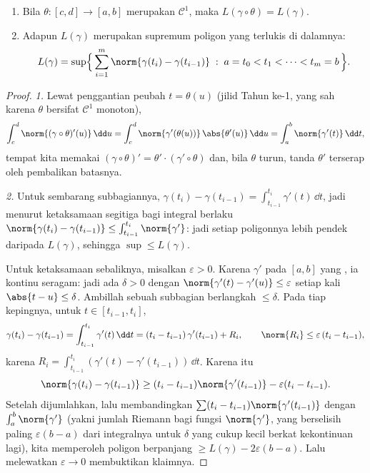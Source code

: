 \begin{theorem}\label{thm:b2:curves:lengthinv}
\leavevmode
\begin{enumerate}
\item Bila $\theta \colon [c, d] \to [a, b]$ merupakan  $\mathcal{C}^1$, maka $L(\gamma \circ \theta) = L(\gamma)$.
\item Adapun $L(\gamma)$ merupakan supremum  poligon yang
terlukis di dalamnya:
\[
L(\gamma)
= \sup\Bigl\{\, \sum_{i=1}^{m} \norm{\gamma(t_i) -
\gamma(t_{i-1})} \;:\; a = t_0 < t_1 < \dots < t_m = b \,\Bigr\}.
\]
\end{enumerate}
\end{theorem}

\begin{proof}
\emph{1.} Lewat penggantian peubah $t = \theta(u)$ (jilid Tahun
ke-1, yang sah karena $\theta$ bersifat $\mathcal{C}^1$ monoton),
\[
\int_c^d \norm{(\gamma\circ\theta)'(u)}\,\dd u
= \int_c^d \norm{\gamma'(\theta(u))}\,\abs{\theta'(u)}\,\dd u
= \int_a^b \norm{\gamma'(t)}\,\dd t ,
\]
tempat kita memakai $(\gamma\circ\theta)' = \theta'\cdot
(\gamma'\circ\theta)$ dan, bila $\theta$ turun, tanda
$\theta'$ terserap oleh pembalikan batasnya.

\emph{2.} Untuk sembarang subbagiannya, $\gamma(t_i) - \gamma(t_{i-1}) =
\int_{t_{i-1}}^{t_i}\gamma'(t)\,\dd t$, jadi menurut ketaksamaan
segitiga bagi integral berlaku $\norm{\gamma(t_i) - \gamma(t_{i-1})}
\leq \int_{t_{i-1}}^{t_i}\norm{\gamma'}$: jadi setiap poligonnya lebih pendek
daripada $L(\gamma)$, sehingga $\sup \leq L(\gamma)$.

Untuk ketaksamaan sebaliknya, misalkan $\varepsilon > 0$. Karena $\gamma'$
 pada $[a,b]$ yang , ia kontinu seragam:
jadi ada $\delta > 0$ dengan $\norm{\gamma'(t) - \gamma'(u)} \leq
\varepsilon$ setiap kali $\abs{t - u} \leq \delta$. Ambillah sebuah subbagian
berlangkah $\leq \delta$. Pada tiap kepingnya, untuk $t \in [t_{i-1}, t_i]$,
\[
\gamma(t_i) - \gamma(t_{i-1})
= \int_{t_{i-1}}^{t_i}\gamma'(t)\,\dd t
= (t_i - t_{i-1})\,\gamma'(t_{i-1}) + R_i,
\qquad
\norm{R_i} \leq \varepsilon\,(t_i - t_{i-1}),
\]
karena $R_i = \int_{t_{i-1}}^{t_i}(\gamma'(t) -
\gamma'(t_{i-1}))\,\dd t$. Karena itu
\[
\norm{\gamma(t_i) - \gamma(t_{i-1})}
\geq (t_i - t_{i-1})\norm{\gamma'(t_{i-1})}
- \varepsilon (t_i - t_{i-1}) .
\]
Setelah dijumlahkan, lalu membandingkan $\sum (t_i -
t_{i-1})\norm{\gamma'(t_{i-1})}$ dengan $\int_a^b\norm{\gamma'}$ (yakni
jumlah Riemann bagi fungsi  $\norm{\gamma'}$, yang berselisih paling
$\varepsilon(b - a)$ dari integralnya untuk $\delta$ yang cukup kecil berkat
kekontinuan  lagi), kita memperoleh poligon berpanjang $\geq
L(\gamma) - 2\varepsilon(b - a)$. Lalu melewatkan $\varepsilon \to 0$
membuktikan klaimnya.
\end{proof}

